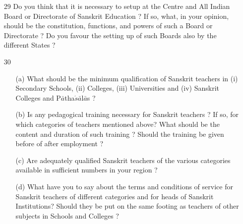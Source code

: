 {\rm 
\begin{itemize}

\item[29] Do you think that it is necessary to setup at the Centre and All Indian Board or Directorate of Sanskrit Education ? If so, what, in your opinion, should be the constitution, functions, and powers of such a Board or Directorate ? Do you favour the setting up of such Boards also by the different States ?

\item[30] \begin{itemize}
           
           \item[(a)] What should be the minimum qualification of Sanskrit teachers in (i) Secondary Schools, (ii) Colleges, (iii) Universities and (iv) Sanskrit Colleges and P$\bar{a}$tha$\acute{s}\bar{a}$l$\bar{a}$s ?
           
           \item[(b)] Is any pedagogical training necessary for Sanskrit teachers ? If so, for which categories of teachers mentioned above? What should be the content and duration of such training ? Should the training be given before of after employment ?
           
           \item[(c)] Are adequately qualified Sanskrit teachers of the various categories available in sufficient numbers in your region ?
           
           \item[(d)] What have you to say about the terms and conditions of service for Sanskrit teachers of different categories and for heads of Sanskrit Institutions? Should they be put on the same footing as teachers of other subjects in Schools and Colleges ?
          \end{itemize}
\end{itemize}
}

